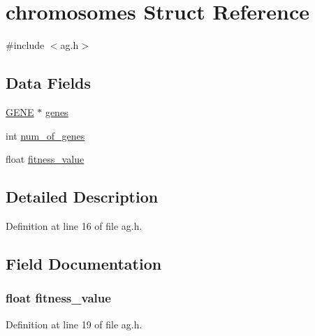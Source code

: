 \hypertarget{structchromosomes}{}\section{chromosomes Struct Reference}
\label{structchromosomes}


{\ttfamily \#include $<$ag.\+h$>$}

\subsection*{Data Fields}
\begin{DoxyCompactItemize}
\item 
\hyperlink{ag_8h_a02a50e28dff2a9bbc394e7fe1ab3e065}{G\+E\+N\+E} $\ast$ \hyperlink{structchromosomes_a60dbdcb96ea8257921bfd3c7813bc40b}{genes}
\item 
int \hyperlink{structchromosomes_ac2ff87645aefa81bbeaaa4ea54ec9781}{num\+\_\+of\+\_\+genes}
\item 
float \hyperlink{structchromosomes_ac3e8d05a19bc880ca2736ad00e31b2af}{fitness\+\_\+value}
\end{DoxyCompactItemize}


\subsection{Detailed Description}


Definition at line 16 of file ag.\+h.



\subsection{Field Documentation}
\hypertarget{structchromosomes_ac3e8d05a19bc880ca2736ad00e31b2af}{}
\subsubsection[{fitness\+\_\+value}]{\setlength{\rightskip}{0pt plus 5cm}float fitness\+\_\+value}\label{structchromosomes_ac3e8d05a19bc880ca2736ad00e31b2af}


Definition at line 19 of file ag.\+h.

\hypertarget{structchromosomes_a60dbdcb96ea8257921bfd3c7813bc40b}{}
